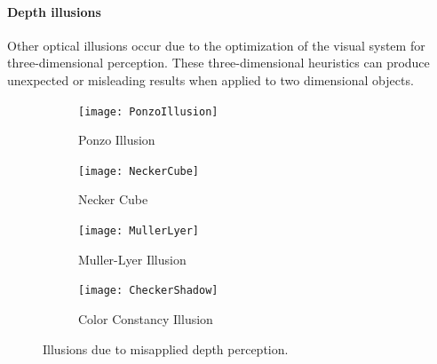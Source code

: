 \documentclass[11pt]{isuthesis}\usepackage[]{graphicx}\usepackage[]{color}
\begin{document}
\paragraph{Depth illusions} Other optical illusions occur due to the optimization of the visual system for three-dimensional perception. These three-dimensional heuristics can produce unexpected or misleading results when applied to two dimensional objects. 

\begin{figure}[htbp]\centering
\hfil
\begin{subfigure}[b]{.4\textwidth}\centering
  \texttt{[image: PonzoIllusion]}
  \caption{Ponzo Illusion}\label{fig:Ponzo}
\end{subfigure}\hfill
\begin{subfigure}[b]{.4\textwidth}\centering
  \texttt{[image: NeckerCube]}
  \caption{Necker Cube}\label{fig:NeckerCube}
\end{subfigure}\hfil

\hfil
\begin{subfigure}[b]{.4\textwidth}\centering
  \texttt{[image: MullerLyer]}
  \caption{Muller-Lyer Illusion}\label{fig:MullerLyer}
\end{subfigure}\hfill
\begin{subfigure}[b]{.4\textwidth}\centering
  \texttt{[image: CheckerShadow]}
  \caption{Color Constancy Illusion}\label{fig:ColorConstancy}
\end{subfigure}\hfil

\caption[Depth Illusions]{Illusions due to misapplied depth perception.}\label{fig:DepthIllusions}
\end{figure}
\end{document}
